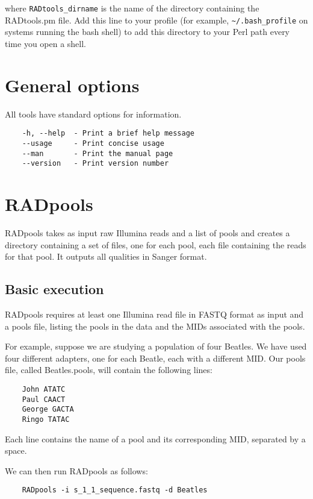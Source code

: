 \documentclass[a4paper]{article}
\begin{document}
where \verb|RADtools_dirname| is the name of the directory containing the RADtools.pm file. Add this line to your profile (for example, \verb|~/.bash_profile| on systems running the bash shell) to add this directory to your Perl path every time you open a shell.

\section{General options}

All tools have standard options for information.

\begin{verbatim}
    -h, --help  - Print a brief help message
    --usage     - Print concise usage
    --man       - Print the manual page
    --version   - Print version number
\end{verbatim}

\section{RADpools}

RADpools takes as input raw Illumina reads and a list of pools and creates a directory containing a set of files, one for each pool, each file containing the reads for that pool. It outputs all qualities in Sanger format.

\subsection{Basic execution}

RADpools requires at least one Illumina read file in FASTQ format as input and a pools file, listing the pools in the data and the MIDs associated with the pools.

For example, suppose we are studying a population of four Beatles. We have used four different adapters, one for each Beatle, each with a different MID. Our pools file, called Beatles.pools, will contain the following lines:

\begin{verbatim}
    John ATATC
    Paul CAACT
    George GACTA
    Ringo TATAC
\end{verbatim}

Each line contains the name of a pool and its corresponding MID, separated by a space.

We can then run RADpools as follows:

\begin{verbatim}
    RADpools -i s_1_1_sequence.fastq -d Beatles
\end{verbatim}
\end{document}
